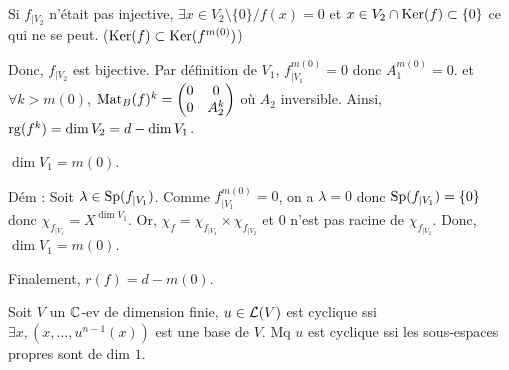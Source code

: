 \begin{solution}
Si $f_{|V_2}$ n'était pas injective, $\exists x \in V_2 \setminus \{0\} / f(x) = 0$
et $x \in V_2 \cap \operatorname{Ker}(f) \subset \{0\}$ ce qui ne se peut.
($\operatorname{Ker}(f) \subset \operatorname{Ker}(f^{m(0)})$)

Donc, $f_{|V_2}$ est bijective.
Par définition de $V_1$, $f_{|V_1}^{m(0)} = 0$ donc $A_1^{m(0)} = 0$.
et $\forall k > m(0)$, $\operatorname{Mat}_B(f)^k = \begin{pmatrix} 0 & 0 \\ 0 & A_2^k \end{pmatrix}$ où $A_2$ inversible.
Ainsi, $\operatorname{rg}(f^k) = \dim V_2 = d - \dim V_1$.

\begin{lemma*}
$\dim V_1 = m(0)$.
\end{lemma*}
Dém : Soit $\lambda \in \operatorname{Sp}(f_{|V_1})$. Comme $f_{|V_1}^{m(0)} = 0$, on a $\lambda = 0$ donc $\operatorname{Sp}(f_{|V_1}) = \{0\}$ donc $\chi_{f_{|V_1}} = X^{\dim V_1}$.
Or, $\chi_f = \chi_{f_{|V_1}} \times \chi_{f_{|V_2}}$ et $0$ n'est pas racine de $\chi_{f_{|V_2}}$.
Donc, $\dim V_1 = m(0)$.

Finalement, $r(f) = d - m(0)$.
\end{solution}


\begin{statementbox}
Soit $V$ un $\mathbb C$-ev de dimension finie, $u \in \mathcal L(V)$ est cyclique ssi $\exists x, (x, \dots, u^{n-1}(x))$ est une base de $V$.
Mq $u$ est cyclique ssi les sous-espaces propres sont de dim $1$.
\end{statementbox}

